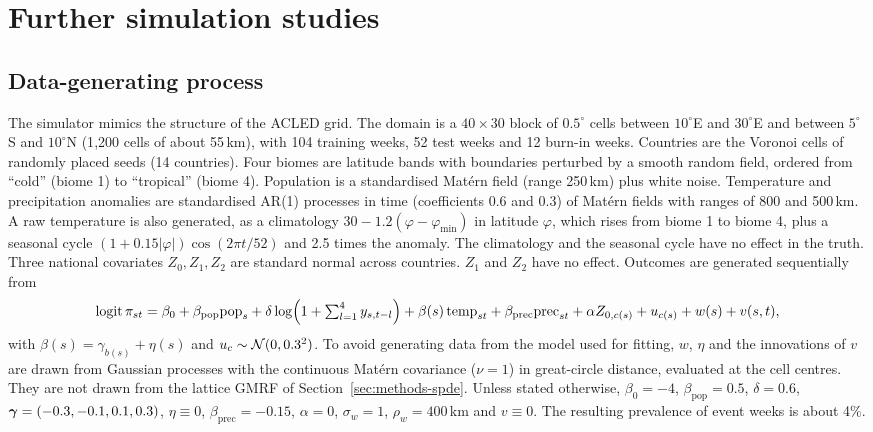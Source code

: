 \section{Further simulation studies}\label{supp:sim-more}

\subsection{Data-generating process}\label{sec:sim-dgp}

The simulator mimics the structure of the ACLED grid. The domain is a
$40 \times 30$ block of $0.5^\circ$ cells between $10^\circ$E and $30^\circ$E and
between $5^\circ$S and $10^\circ$N (1{,}200 cells of about 55\,km), with 104 training
weeks, 52 test weeks and 12 burn-in weeks. Countries are the Voronoi cells of randomly
placed seeds (14 countries). Four biomes are latitude bands with boundaries
perturbed by a smooth random field, ordered from ``cold'' (biome 1) to ``tropical''
(biome 4). Population is a standardised Mat\'ern field (range 250\,km) plus white
noise. Temperature and precipitation anomalies are standardised AR(1) processes in time
(coefficients 0.6 and 0.3) of Mat\'ern fields with ranges of 800 and 500\,km. A raw
temperature is also generated, as a climatology $30 - 1.2(\varphi - \varphi_{\min})$
in latitude $\varphi$, which rises from biome 1 to biome 4, plus a seasonal cycle
$(1 + 0.15|\varphi|)\cos(2\pi t/52)$ and 2.5 times the anomaly. The climatology and
the seasonal cycle have no effect in the truth. Three national covariates
$Z_0, Z_1, Z_2$ are standard normal across countries. $Z_1$ and $Z_2$ have no effect.
Outcomes are generated sequentially from
\begin{equation}\label{eq:sim}
\operatorname{logit}\pi_{st} = \beta_0 + \beta_{\mathrm{pop}}\mathrm{pop}_s
+ \delta\log\Bigl(1 + \textstyle\sum_{l=1}^{4} y_{s,t-l}\Bigr)
+ \beta(s)\,\mathrm{temp}_{st} + \beta_{\mathrm{prec}}\mathrm{prec}_{st}
+ \alpha Z_{0,c(s)} + u_{c(s)} + w(s) + v(s,t),
\end{equation}
with $\beta(s) = \gamma_{b(s)} + \eta(s)$ and $u_c \sim \mathcal{N}(0, 0.3^2)$. To avoid
generating data from the model used for fitting, $w$, $\eta$ and the innovations of
$v$ are drawn from Gaussian processes with the continuous Mat\'ern covariance
($\nu = 1$) in great-circle distance, evaluated at the cell centres. They are not drawn
from the lattice GMRF of Section~\ref{sec:methods-spde}. Unless stated otherwise,
$\beta_0 = -4$, $\beta_{\mathrm{pop}} = 0.5$, $\delta = 0.6$,
$\bm{\gamma} = (-0.3, -0.1, 0.1, 0.3)$, $\eta \equiv 0$, $\beta_{\mathrm{prec}} = -0.15$,
$\alpha = 0$, $\sigma_w = 1$, $\rho_w = 400$\,km and $v \equiv 0$. The resulting
prevalence of event weeks is about 4\%.

